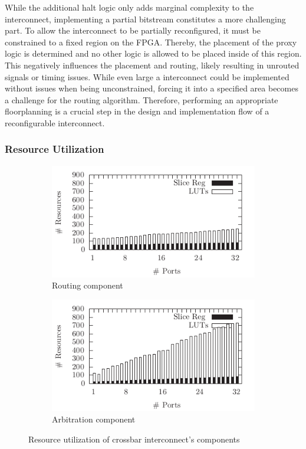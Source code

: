 While the additional halt logic only adds marginal complexity to the
interconnect, implementing a partial bitstream constitutes a more challenging
part. To allow the interconnect to be partially reconfigured, it must be
constrained to a fixed region on the \ac{FPGA}.  Thereby, the placement of the
proxy logic is determined and no other logic is allowed to be placed inside of
this region. This negatively influences the placement and routing, likely
resulting in unrouted signals or timing issues. While even large a
interconnect could be implemented without issues when being unconstrained,
forcing it into a specified area becomes a challenge for the routing
algorithm. Therefore, performing an appropriate floorplanning is a crucial
step in the design and implementation flow of a reconfigurable interconnect.

\subsubsection{Resource Utilization}
\begin{figure}
	\centering
	\begin{subfigure}{0.49\textwidth}
		\centering
		\includegraphics[width=\textwidth]{../figures/eval_router}
		\caption{Routing component}
		\label{fig:crossbar_util_router}
	\end{subfigure}
	\begin{subfigure}{0.49\textwidth}
		\centering
		\includegraphics[width=\textwidth]{../figures/eval_arbiter}
		\caption{Arbitration component}
		\label{fig:crossbar_util_arbiter}
	\end{subfigure}
	\caption{Resource utilization of crossbar interconnect's components}
	\label{fig:crossbar_util}
\end{figure}
